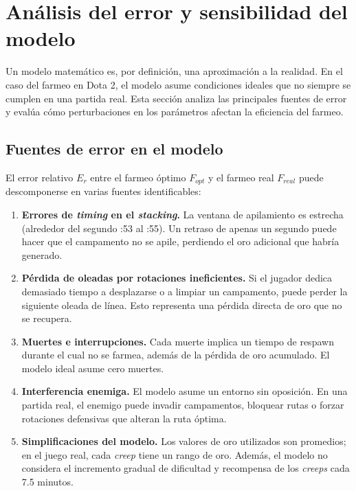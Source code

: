 \section{Análisis del error y sensibilidad del modelo}

Un modelo matemático es, por definición, una aproximación a la realidad. En el caso del farmeo en Dota 2, el modelo asume condiciones ideales que no siempre se cumplen en una partida real. Esta sección analiza las principales fuentes de error y evalúa cómo perturbaciones en los parámetros afectan la eficiencia del farmeo.

\subsection{Fuentes de error en el modelo}

El error relativo \(E_r\) entre el farmeo óptimo \(F_{opt}\) y el farmeo real \(F_{real}\) puede descomponerse en varias fuentes identificables:

\begin{enumerate}
    \item \textbf{Errores de \textit{timing} en el \textit{stacking}.} La ventana de apilamiento es estrecha (alrededor del segundo :53 al :55). Un retraso de apenas un segundo puede hacer que el campamento no se apile, perdiendo el oro adicional que habría generado.
    
    \item \textbf{Pérdida de oleadas por rotaciones ineficientes.} Si el jugador dedica demasiado tiempo a desplazarse o a limpiar un campamento, puede perder la siguiente oleada de línea. Esto representa una pérdida directa de oro que no se recupera.
    
    \item \textbf{Muertes e interrupciones.} Cada muerte implica un tiempo de respawn durante el cual no se farmea, además de la pérdida de oro acumulado. El modelo ideal asume cero muertes.
    
    \item \textbf{Interferencia enemiga.} El modelo asume un entorno sin oposición. En una partida real, el enemigo puede invadir campamentos, bloquear rutas o forzar rotaciones defensivas que alteran la ruta óptima.
    
    \item \textbf{Simplificaciones del modelo.} Los valores de oro utilizados son promedios; en el juego real, cada \textit{creep} tiene un rango de oro. Además, el modelo no considera el incremento gradual de dificultad y recompensa de los \textit{creeps} cada 7.5 minutos.
\end{enumerate}

